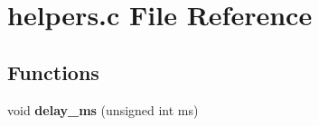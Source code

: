 \section{helpers.c File Reference}
\label{helpers_8c}
\subsection*{Functions}
\begin{CompactItemize}
\item 
void {\bf delay\_\-ms} (unsigned int ms)
\end{CompactItemize}
